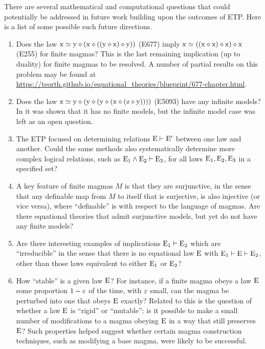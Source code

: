 There are several mathematical and computational questions that could potentially be addressed in future work building upon the outcomes of ETP.  Here is a list of some possible such future directions.
\begin{enumerate}
  \item Does the law $\mathrm{x} \simeq \mathrm{y} \diamond (\mathrm{x} \diamond ((\mathrm{y} \diamond \mathrm{x}) \diamond \mathrm{y}))$ (E677) imply $\mathrm{x} \simeq ((\mathrm{x} \diamond \mathrm{x}) \diamond \mathrm{x}) \diamond \mathrm{x}$ (E255) for finite magmas? This is the last remaining implication (up to duality) for finite magmas to be resolved.  A number of partial results on this problem may be found at \url{https://teorth.github.io/equational_theories/blueprint/677-chapter.html}.
  \item Does the law $\mathrm{x} \simeq \mathrm{y} \diamond (\mathrm{y} \diamond (\mathrm{y} \diamond (\mathrm{x} \diamond (\mathrm{z} \diamond \mathrm{y}))))$ (E5093) have any infinite models? In \cite{Kisielewicz2} it was shown that it has no finite models, but the infinite model case was left as an open question.
  \item The ETP focused on determining relations $\mathrm{E} \vdash \mathrm{E}'$ between one law and another.  Could the same methods also systematically determine more complex logical relations, such as $\mathrm{E}_1 \wedge \mathrm{E}_2 \vdash \mathrm{E}_3$, for all laws $\mathrm{E}_1,\mathrm{E}_2,\mathrm{E}_3$ in a specified set?
  \item A key feature of finite magmas $M$ is that they are surjunctive, in the sense that any definable map from $M$ to itself that is surjective, is also injective (or vice versa), where ``definable'' is with respect to the language of magmas.  Are there equational theories that admit surjunctive models, but yet do not have any finite models?
  \item Are there interesting examples of implications $\mathrm{E}_1 \vdash \mathrm{E}_2$ which are ``irreducible'' in the sense that there is no equational law $\mathrm{E}$ with $\mathrm{E}_1 \vdash \mathrm{E} \vdash \mathrm{E}_2$, other than those laws equivalent to either $\mathrm{E}_1$ or $\mathrm{E}_2$?
  \item How ``stable'' is a given law $\mathrm{E}$?  For instance, if a finite magma obeys a law $\mathrm{E}$ some proportion $1-\varepsilon$ of the time, with $\varepsilon$ small, can the magma be perturbed into one that obeys $\mathrm{E}$ exactly?  Related to this is the question of whether a law $\mathrm{E}$ is ``rigid'' or ``mutable'': is it possible to make a small number of modifications to a magma obeying $\mathrm{E}$ in a way that still preserves $\mathrm{E}$?  Such properties helped suggest whether certain magma construction techniques, such as modifying a base magma, were likely to be successful.
\end{enumerate}

